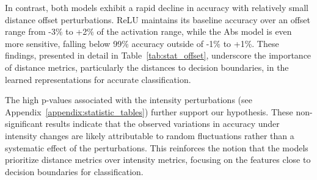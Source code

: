 In contrast, both models exhibit a rapid decline in accuracy with relatively small distance offset perturbations. ReLU maintains its baseline accuracy over an offset range from -3\% to +2\% of the activation range, while the Abs model is even more sensitive, falling below 99\% accuracy outside of -1\% to +1\%. These findings, presented in detail in Table~\ref{tab:stat_offset}, underscore the importance of distance metrics, particularly the distances to decision boundaries, in the learned representations for accurate classification.

The high p-values associated with the intensity perturbations (see Appendix~\ref{appendix:statistic_tables}) further support our hypothesis. These non-significant results indicate that the observed variations in accuracy under intensity changes are likely attributable to random fluctuations rather than a systematic effect of the perturbations. This reinforces the notion that the models prioritize distance metrics over intensity metrics, focusing on the  features close to decision boundaries for classification.
